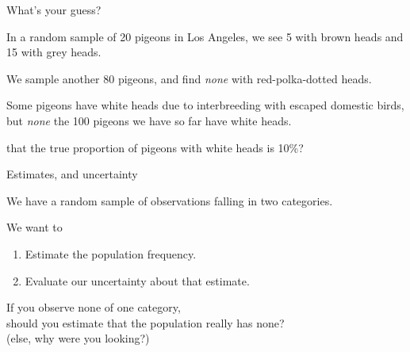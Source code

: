 \begin{frame}{What's your guess?}

    In a random sample of 20 pigeons in Los Angeles,
    we see 5 with brown heads and 15 with grey heads.\\

    \vspace{2em}

    \pause

    We sample another 80 pigeons, and find \emph{none} with red-polka-dotted heads.\\

    \vspace{2em}

    \pause

    Some pigeons have white heads due to interbreeding with escaped domestic birds,
    but \emph{none} the 100 pigeons we have so far have white heads.\\


     that the true proportion of pigeons with white heads is 10\%?


\end{frame}

\begin{frame}{Estimates, and uncertainty}

    We have a random sample of observations falling in two categories.

    \vspace{2em}

    We want to
    \begin{enumerate}
        \item Estimate the population frequency.
        \item Evaluate our uncertainty about that estimate.
    \end{enumerate}

    \vspace{2em}

    If you observe \alert{none} of one category, \\
        should you estimate that the population really has none? \\
            \hspace{3em}   {\small (else, why were you looking?)}

\end{frame}

